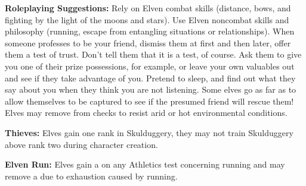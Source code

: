 {\textbf{Roleplaying Suggestions:}
Rely on Elven combat skills (distance, bows, and
fighting by the light of the moons and stars). Use Elven
noncombat skills and philosophy (running, escape from
entangling situations or relationships). When someone
professes to be your friend, dismiss them at first and then
later, offer them a test of trust. Don't tell them that it is a
test, of course. Ask them to give you one of their prize
possessions, for example, or leave your own valuables out
and see if they take advantage of you. Pretend to sleep,
and find out what they say about you when they think
you are not listening. Some elves go as far as to allow
themselves to be captured to see if the presumed friend
will rescue them!
}
{Elves may remove \setback\setback from checks to resist arid or hot environmental conditions.}
{\item \textbf{Thieves: } Elves gain one rank in Skulduggery, they may not train Skulduggery above rank two during character creation. }
{\item \textbf{Elven Run: } Elves gain a \boost on any Athletics test concerning running and may remove a \setback due to exhaustion caused by running.}
{}
{}
{}
{}
{}
